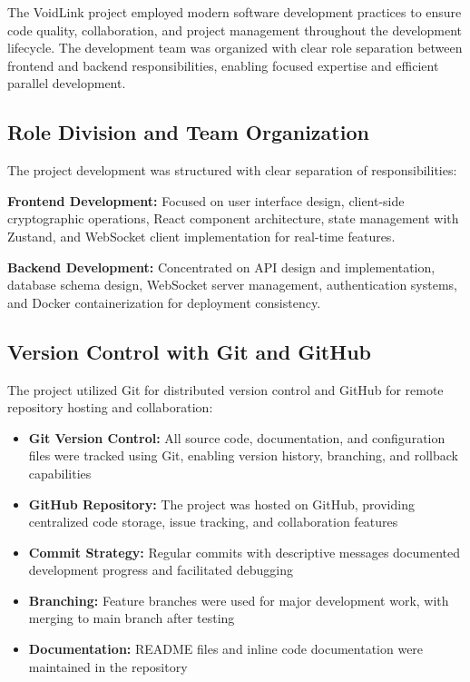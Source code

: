 \documentclass[12pt,a4paper,openany]{book}
\begin{document}
The VoidLink project employed modern software development practices to ensure code quality, collaboration, and project management throughout the development lifecycle. The development team was organized with clear role separation between frontend and backend responsibilities, enabling focused expertise and efficient parallel development.

\subsection{Role Division and Team Organization}

The project development was structured with clear separation of responsibilities:

\textbf{Frontend Development:} Focused on user interface design, client-side cryptographic operations, React component architecture, state management with Zustand, and WebSocket client implementation for real-time features.

\textbf{Backend Development:} Concentrated on API design and implementation, database schema design, WebSocket server management, authentication systems, and Docker containerization for deployment consistency.

\subsection{Version Control with Git and GitHub}

The project utilized Git for distributed version control and GitHub for remote repository hosting and collaboration:

\begin{itemize}
\item \textbf{Git Version Control:} All source code, documentation, and configuration files were tracked using Git, enabling version history, branching, and rollback capabilities
\item \textbf{GitHub Repository:} The project was hosted on GitHub, providing centralized code storage, issue tracking, and collaboration features
\item \textbf{Commit Strategy:} Regular commits with descriptive messages documented development progress and facilitated debugging
\item \textbf{Branching:} Feature branches were used for major development work, with merging to main branch after testing
\item \textbf{Documentation:} README files and inline code documentation were maintained in the repository
\end{itemize}
\end{document}
